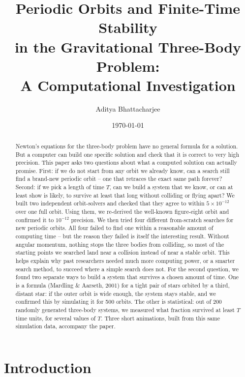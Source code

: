 \documentclass[11pt]{article}
\title{Periodic Orbits and Finite-Time Stability\\
in the Gravitational Three-Body Problem:\\
\large A Computational Investigation}
\author{Aditya Bhattacharjee}
\date{\today}
\begin{document}
\maketitle

\begin{abstract}
Newton's equations for the three-body problem have no general formula for a
solution. But a computer can build one specific solution and check that it
is correct to very high precision. This paper asks two questions about what
a computed solution can actually promise. First: if we do not start from
any orbit we already know, can a search still find a brand-new periodic
orbit -- one that retraces the exact same path forever? Second: if we pick
a length of time $T$, can we build a system that we know, or can at least
show is likely, to survive at least that long without colliding or flying
apart? We built two independent orbit-solvers and checked that they agree
to within $5\times10^{-12}$ over one full orbit. Using them, we re-derived
the well-known figure-eight orbit and confirmed it to $10^{-12}$ precision.
We then tried four different from-scratch searches for new periodic
orbits. All four failed to find one within a reasonable amount of
computing time -- but the reason they failed is itself the interesting
result. Without angular momentum, nothing stops the three bodies from
colliding, so most of the starting points we searched land near a
collision instead of near a stable orbit. This helps explain why past
researchers needed much more computing power, or a smarter search method,
to succeed where a simple search does not. For the second question, we
found two separate ways to build a system that survives a chosen amount of
time. One is a formula (Mardling \& Aarseth, 2001) for a tight pair of
stars orbited by a third, distant star: if the outer orbit is wide enough,
the system stays stable, and we confirmed this by simulating it for 500
orbits. The other is statistical: out of 200 randomly generated three-body
systems, we measured what fraction survived at least $T$ time units, for
several values of $T$. Three short animations, built from this same
simulation data, accompany the paper.
\end{abstract}

\tableofcontents

\section{Introduction}
\end{document}
